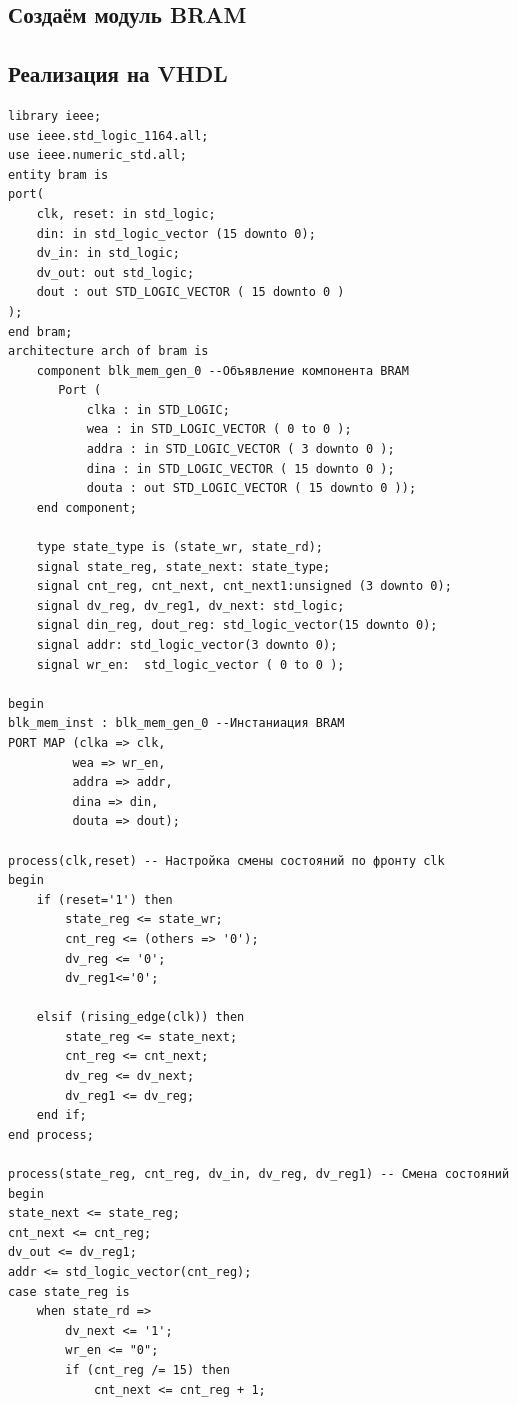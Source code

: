\subsection{Создаём модуль BRAM}
\subsection{Реализация на VHDL}
\begin{Code}
\begin{lstlisting}
library ieee;
use ieee.std_logic_1164.all;
use ieee.numeric_std.all;
entity bram is
port(
    clk, reset: in std_logic;
    din: in std_logic_vector (15 downto 0);
    dv_in: in std_logic;
    dv_out: out std_logic;
    dout : out STD_LOGIC_VECTOR ( 15 downto 0 )
);
end bram;
architecture arch of bram is
    component blk_mem_gen_0 --Объявление компонента BRAM
       Port ( 
           clka : in STD_LOGIC;
           wea : in STD_LOGIC_VECTOR ( 0 to 0 );
           addra : in STD_LOGIC_VECTOR ( 3 downto 0 );
           dina : in STD_LOGIC_VECTOR ( 15 downto 0 );
           douta : out STD_LOGIC_VECTOR ( 15 downto 0 ));
    end component;
    
    type state_type is (state_wr, state_rd);
    signal state_reg, state_next: state_type;
    signal cnt_reg, cnt_next, cnt_next1:unsigned (3 downto 0);
    signal dv_reg, dv_reg1, dv_next: std_logic;
    signal din_reg, dout_reg: std_logic_vector(15 downto 0);
    signal addr: std_logic_vector(3 downto 0);
    signal wr_en:  std_logic_vector ( 0 to 0 );

begin
blk_mem_inst : blk_mem_gen_0 --Инстаниация BRAM
PORT MAP (clka => clk,
         wea => wr_en,
         addra => addr,
         dina => din,
         douta => dout);   

process(clk,reset) -- Настройка смены состояний по фронту clk
begin
    if (reset='1') then
        state_reg <= state_wr;
        cnt_reg <= (others => '0');
        dv_reg <= '0';
        dv_reg1<='0';

    elsif (rising_edge(clk)) then
        state_reg <= state_next;
        cnt_reg <= cnt_next;
        dv_reg <= dv_next;
        dv_reg1 <= dv_reg;  
    end if;
end process;

process(state_reg, cnt_reg, dv_in, dv_reg, dv_reg1) -- Смена состояний
begin
state_next <= state_reg;
cnt_next <= cnt_reg;
dv_out <= dv_reg1;
addr <= std_logic_vector(cnt_reg);
case state_reg is
    when state_rd =>
        dv_next <= '1';
        wr_en <= "0"; 
        if (cnt_reg /= 15) then
            cnt_next <= cnt_reg + 1;  
            

\end{lstlisting}
\end{Code}
